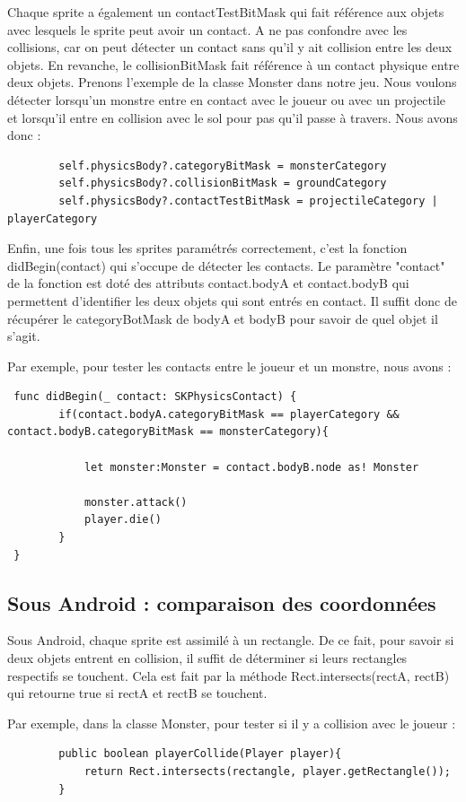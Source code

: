 \documentclass{article}
\begin{document}
Chaque sprite a également un contactTestBitMask qui fait référence aux objets avec lesquels le sprite peut avoir un contact. A ne pas confondre avec les collisions, car on peut détecter un contact sans qu'il y ait collision entre les deux objets.
En revanche, le collisionBitMask fait référence à un contact physique entre deux objets.
Prenons l'exemple de la classe Monster dans notre jeu. 
Nous voulons détecter lorsqu'un monstre entre en contact avec le joueur ou avec un projectile et lorsqu'il entre en collision avec le sol pour pas qu'il passe à travers. Nous avons donc : 
\begin{verbatim}
        self.physicsBody?.categoryBitMask = monsterCategory
        self.physicsBody?.collisionBitMask = groundCategory
        self.physicsBody?.contactTestBitMask = projectileCategory | playerCategory
\end{verbatim}

Enfin, une fois tous les sprites paramétrés correctement, c'est la fonction didBegin(contact) qui s'occupe de détecter les contacts. Le paramètre "contact" de la fonction est doté des attributs contact.bodyA et contact.bodyB qui permettent d'identifier les deux objets qui sont entrés en contact. Il suffit donc de récupérer le categoryBotMask de bodyA et bodyB pour savoir de quel objet il s'agit. 

Par exemple, pour tester les contacts entre le joueur et un monstre, nous avons : 

\begin{verbatim}
 func didBegin(_ contact: SKPhysicsContact) {
 		if(contact.bodyA.categoryBitMask == playerCategory && contact.bodyB.categoryBitMask == monsterCategory){
            
            let monster:Monster = contact.bodyB.node as! Monster

            monster.attack()
            player.die()
        }
 }
\end{verbatim}

\subsection{Sous Android : comparaison des coordonnées}
Sous Android, chaque sprite est assimilé à un rectangle. De ce fait, pour savoir si deux objets entrent en collision, il suffit de déterminer si leurs rectangles respectifs se touchent. Cela est fait par la méthode Rect.intersects(rectA, rectB) qui retourne true si rectA et rectB se touchent.

Par exemple, dans la classe Monster, pour tester si  il y a collision avec le joueur :
\begin{verbatim}
        public boolean playerCollide(Player player){
            return Rect.intersects(rectangle, player.getRectangle());
        }
\end{verbatim}
\end{document}
